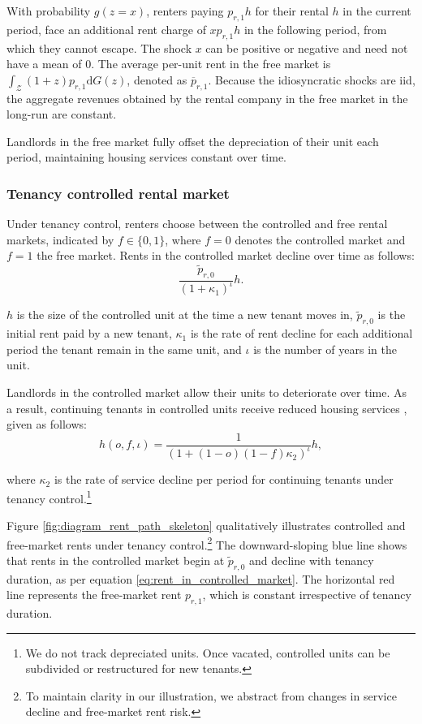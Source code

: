 \documentclass[parskip=full]{article}
\begin{document}
With probability $g(z=x)$, renters paying $p_{r,1}h$ for their rental $h$ in the current period, face an additional rent charge of $x p_{r,1}h$ in the following period, from which they cannot escape. The shock $x$ can be positive or negative and need not have a mean of 0. The average per-unit rent in the free market is $\int_\mathcal{Z}(1+z)p_{r,1}\mathrm{d}G(z)$, denoted as $\overline{p}_{r,1}$. Because the idiosyncratic shocks are iid, the aggregate revenues obtained by the rental company in the free market in the long-run are constant. 

Landlords in the free market fully offset the
depreciation of their unit each period, maintaining housing services constant over time.

\subsubsection{Tenancy controlled rental market}

Under tenancy control, renters choose between the controlled and free rental markets, indicated by $f \in \{0,1\}$, where $f=0$ denotes the controlled market and $f=1$ the free market. Rents in the controlled market decline over time as follows:
\begin{equation}\label{eq:rent_in_controlled_market}
\frac{\tilde{p}_{r,0}}{(1+\kappa_{1})^{\iota}} h.
\end{equation} 

\noindent $h$ is the size of the controlled unit at the time a new tenant moves in, $\tilde{p}_{r,0}$ is the initial rent paid by a new tenant, $\kappa_{1}$ is the rate of rent decline for each additional period the tenant remain in the same unit, and $\iota$ is the number of years in the unit.

Landlords in the controlled market allow their units to deteriorate over time. As a result, continuing tenants in controlled units receive reduced housing services \citep{gl-1990,murray_et_al-1991}, given as follows:
\begin{equation}
h(o,f,\iota)=\frac{1}{(1+(1-o)(1-f)\kappa_{2})^{\iota}} h,
\end{equation}
 
\noindent where $\kappa_{2}$ is the rate of service decline per period for continuing tenants under tenancy control.\footnote{We do not track depreciated units. Once vacated, controlled units can be subdivided or restructured for new tenants.}

Figure \ref{fig:diagram_rent_path_skeleton} qualitatively illustrates controlled and free-market rents under tenancy control.\footnote{To maintain clarity in our illustration, we abstract from changes in service decline and free-market rent risk.} The downward-sloping blue line shows that rents in the controlled market begin at $\tilde{p}_{r,0}$ and decline with tenancy duration, as per equation \eqref{eq:rent_in_controlled_market}. The horizontal red line represents the free-market rent $p_{r,1}$, which is constant irrespective of tenancy duration. 
\end{document}
